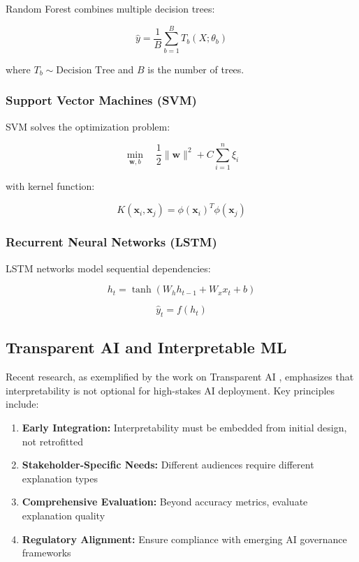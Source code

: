 \documentclass[11pt,a4paper]{article}
\begin{document}
Random Forest combines multiple decision trees:

\begin{equation}
\hat{y} = \frac{1}{B}\sum_{b=1}^B T_b(X; \theta_b)
\end{equation}

where $T_b \sim \text{Decision Tree}$ and $B$ is the number of trees.

\subsubsection{Support Vector Machines (SVM)}

SVM solves the optimization problem:

\begin{equation}
\min_{\mathbf{w},b} \quad \frac{1}{2}\|\mathbf{w}\|^2 + C\sum_{i=1}^n \xi_i
\end{equation}

with kernel function:

\begin{equation}
K(\mathbf{x}_i, \mathbf{x}_j) = \phi(\mathbf{x}_i)^T\phi(\mathbf{x}_j)
\end{equation}

\subsubsection{Recurrent Neural Networks (LSTM)}

LSTM networks model sequential dependencies:

\begin{equation}
h_t = \tanh(W_h h_{t-1} + W_x x_t + b)
\end{equation}

\begin{equation}
\hat{y}_t = f(h_t)
\end{equation}

\subsection{Transparent AI and Interpretable ML}

Recent research, as exemplified by the work on Transparent AI \cite{transparent_ai_2025}, emphasizes that interpretability is not optional for high-stakes AI deployment. Key principles include:

\begin{enumerate}
    \item \textbf{Early Integration:} Interpretability must be embedded from initial design, not retrofitted
    \item \textbf{Stakeholder-Specific Needs:} Different audiences require different explanation types
    \item \textbf{Comprehensive Evaluation:} Beyond accuracy metrics, evaluate explanation quality
    \item \textbf{Regulatory Alignment:} Ensure compliance with emerging AI governance frameworks
\end{enumerate}
\end{document}
